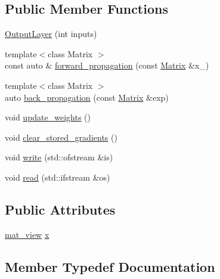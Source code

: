 \subsection*{Public Member Functions}
\begin{DoxyCompactItemize}
\item 
\hyperlink{structBC_1_1nn_1_1OutputLayer_a51f0d41c5be759cae9d7aa9a971f50ee}{Output\+Layer} (int inputs)
\item 
{\footnotesize template$<$class Matrix $>$ }\\const auto \& \hyperlink{structBC_1_1nn_1_1OutputLayer_ad059d90638a76241a3e7cb8145492dd4}{forward\+\_\+propagation} (const \hyperlink{namespaceBC_1_1tensors_1_1common__using_a6fc3153d379a42b1a97df46ed5b71a29}{Matrix} \&x\+\_\+)
\item 
{\footnotesize template$<$class Matrix $>$ }\\auto \hyperlink{structBC_1_1nn_1_1OutputLayer_a6bf008313ff3b4d64ac339bf336577cf}{back\+\_\+propagation} (const \hyperlink{namespaceBC_1_1tensors_1_1common__using_a6fc3153d379a42b1a97df46ed5b71a29}{Matrix} \&exp)
\item 
void \hyperlink{structBC_1_1nn_1_1OutputLayer_a5c2ca5ead550670cb40db93124c993f3}{update\+\_\+weights} ()
\item 
void \hyperlink{structBC_1_1nn_1_1OutputLayer_af1192753761d2b5bdd460e86a73a2b29}{clear\+\_\+stored\+\_\+gradients} ()
\item 
void \hyperlink{structBC_1_1nn_1_1OutputLayer_abd8e43f5306f276fa65ff2825f81961b}{write} (std\+::ofstream \&is)
\item 
void \hyperlink{structBC_1_1nn_1_1OutputLayer_abfde0ab0b94abe077726e134c8fcc1ae}{read} (std\+::ifstream \&os)
\end{DoxyCompactItemize}
\subsection*{Public Attributes}
\begin{DoxyCompactItemize}
\item 
\hyperlink{structBC_1_1nn_1_1OutputLayer_aeb45a3c352a438cfb69bb17b40a14bf2}{mat\+\_\+view} \hyperlink{structBC_1_1nn_1_1OutputLayer_ae0a078b2729e63488341170aed4099e6}{x}
\end{DoxyCompactItemize}


\subsection{Member Typedef Documentation}
